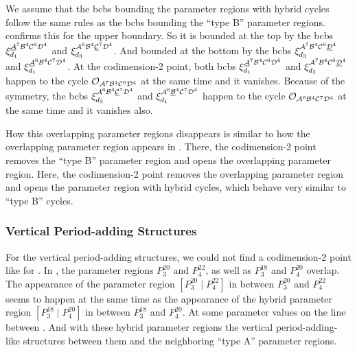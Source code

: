 We assume that the \glspl{bcb} bounding the parameter regions with hybrid cycles follow the same rules as the \glspl{bcb} bounding the ``type B'' parameter regions.
 confirms this for the upper boundary.
So it is bounded at the top by the \glspl{bcb} $\xi_{d_1}^{\underline{\mathcal{A}}^7\mathcal{B}^4\mathcal{C}^6\mathcal{D}^4}$ and $\xi_{d_3}^{\mathcal{A}^6\mathcal{B}^4\underline{\mathcal{C}}^7\mathcal{D}^4}$.
And bounded at the bottom by the \glspl{bcb} $\xi_{d_3}^{\mathcal{A}^7\mathcal{B}^4\mathcal{C}^6\underline{\mathcal{D}}^4}$ and $\xi_{d_1}^{\underline{\mathcal{A}}^6\mathcal{B}^4\mathcal{C}^7\mathcal{D}^4}$.
At the codimension-2 point, both \glspl{bcb} $\xi_{d_1}^{\underline{\mathcal{A}}^7\mathcal{B}^4\mathcal{C}^6\mathcal{D}^4}$ and $\xi_{d_3}^{\mathcal{A}^7\mathcal{B}^4\mathcal{C}^6\underline{\mathcal{D}}^4}$ happen to the cycle $\mathcal{O}_{\mathcal{A}^7\mathcal{B}^4\mathcal{C}^6\mathcal{D}^4}$ at the same time and it vanishes.
Because of the symmetry, the \glspl{bcb} $\xi_{d_3}^{\mathcal{A}^6\mathcal{B}^4\underline{\mathcal{C}}^7\mathcal{D}^4}$ and $\xi_{d_1}^{\mathcal{A}^6\underline{\mathcal{B}}^4\mathcal{C}^7\mathcal{D}^4}$ happen to the cycle $\mathcal{O}_{\mathcal{A}^6\mathcal{B}^4\mathcal{C}^7\mathcal{D}^4}$ at the same time and it vanishes also.


How this overlapping parameter regions disappears is similar to how the overlapping parameter region appears in .
There, the codimension-2 point removes the ``type B'' parameter region and opens the overlapping parameter region.
Here, the codimension-2 point removes the overlapping parameter region and opens the parameter region with hybrid cycles, which behave very similar to ``type B'' cycles.

\subsubsection{Vertical Period-adding Structures}
\label{sec:add.change.appa.vert}

For the vertical period-adding structures, we could not find a codimension-2 point like for .
In , the parameter regions $P^{20}_3$ and $P^{22}_4$, as well as $P^{18}_3$ and $P^{20}_4$ overlap.
The appearance of the parameter region $\left[P^{20}_3 \mid P^{22}_4\right]$ in between $P^{20}_3$ and $P^{22}_4$ seems to happen at the same time as the appearance of the hybrid parameter region $\left[P^{18}_3 \mid P^{20}_4\right]$ in between $P^{18}_3$ and $P^{20}_4$.
At some parameter values on the line between .
And with these hybrid parameter regions the vertical period-adding-like structures between them and the neighboring ``type A'' parameter regions.

